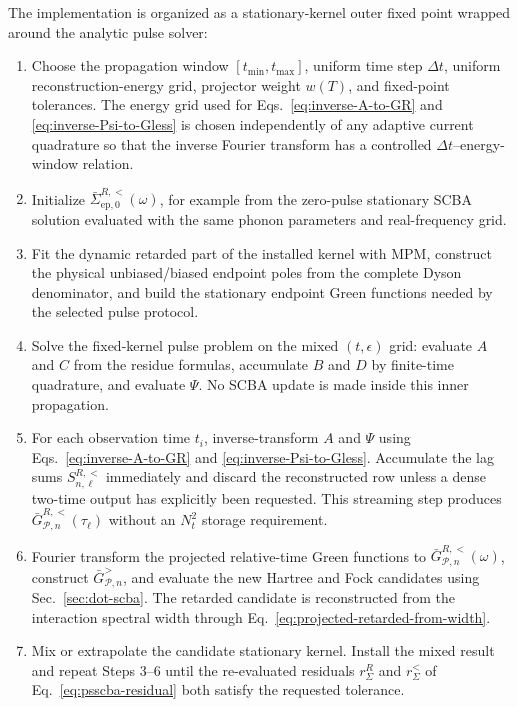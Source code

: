 \documentclass[
 reprint,
 superscriptaddress,
 amsmath,amssymb,
 aps,prb,
 longbibliography,
 floatfix
]{revtex4-2}
\newcommand{\ep}{\mathrm{ep}}
\begin{document}
The implementation is organized as a stationary-kernel outer fixed point wrapped around the analytic pulse solver:
\begin{enumerate}
\item Choose the propagation window \([t_{\min},t_{\max}]\), uniform time step \(\Delta t\), uniform reconstruction-energy grid, projector weight \(w(T)\), and fixed-point tolerances. The energy grid used for Eqs.~\eqref{eq:inverse-A-to-GR} and \eqref{eq:inverse-Psi-to-Gless} is chosen independently of any adaptive current quadrature so that the inverse Fourier transform has a controlled \(\Delta t\)--energy-window relation.

\item Initialize \(\bar\Sigma_{\ep,0}^{R,<}(\omega)\), for example from the zero-pulse stationary SCBA solution evaluated with the same phonon parameters and real-frequency grid.

\item Fit the dynamic retarded part of the installed kernel with MPM, construct the physical unbiased/biased endpoint poles from the complete Dyson denominator, and build the stationary endpoint Green functions needed by the selected pulse protocol.

\item Solve the fixed-kernel pulse problem on the mixed \((t,\epsilon)\) grid: evaluate \(A\) and \(C\) from the residue formulas, accumulate \(B\) and \(D\) by finite-time quadrature, and evaluate \(\Psi\). No SCBA update is made inside this inner propagation.

\item For each observation time \(t_i\), inverse-transform \(A\) and \(\Psi\) using Eqs.~\eqref{eq:inverse-A-to-GR} and \eqref{eq:inverse-Psi-to-Gless}. Accumulate the lag sums \(S_{n,\ell}^{R,<}\) immediately and discard the reconstructed row unless a dense two-time output has explicitly been requested. This streaming step produces \(\bar G_{\mathcal P,n}^{R,<}(\tau_\ell)\) without an \(N_t^2\) storage requirement.

\item Fourier transform the projected relative-time Green functions to \(\bar G_{\mathcal P,n}^{R,<}(\omega)\), construct \(\bar G_{\mathcal P,n}^{>}\), and evaluate the new Hartree and Fock candidates using Sec.~\ref{sec:dot-scba}. The retarded candidate is reconstructed from the interaction spectral width through Eq.~\eqref{eq:projected-retarded-from-width}.

\item Mix or extrapolate the candidate stationary kernel. Install the mixed result and repeat Steps 3--6 until the re-evaluated residuals \(r_\Sigma^R\) and \(r_\Sigma^<\) of Eq.~\eqref{eq:psscba-residual} both satisfy the requested tolerance.


\end{enumerate}
\end{document}
